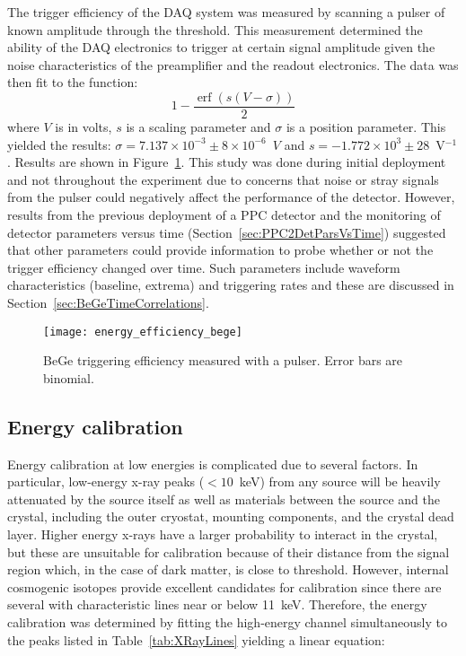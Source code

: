 The trigger efficiency of the DAQ system was measured by scanning a pulser of known amplitude through the threshold.  This measurement determined the ability of the DAQ electronics to trigger at certain signal amplitude given the noise characteristics of the preamplifier and the readout electronics.  The data was then fit to the function:
			\begin{equation}
				1 - \frac{\operatorname{erf} \left(s(V-\sigma)\right)}{2}
				\label{eqn:TrigEfficiency}
			\end{equation}
where $V$ is in volts, $s$ is a scaling parameter and $\sigma$ is a position parameter.  This yielded the results: $\sigma = 7.137\times10^{-3}\pm8\times10^{-6}$~$V$ and $s = -1.772\times10^{3}\pm28$~V$^{-1}$.  Results are shown in Figure~\ref{fig:BeGeTriggeringEfficiency}.  This study was done during initial deployment and not throughout the experiment due to concerns that noise or stray signals from the pulser could negatively affect the performance of the detector.  However, results from the previous deployment of a PPC detector and the monitoring of detector parameters versus time (Section~\ref{sec:PPC2DetParsVsTime}) suggested that other parameters could provide information to probe whether or not the trigger efficiency changed over time.  Such parameters include waveform characteristics (baseline, extrema) and triggering rates and these are discussed in Section~\ref{sec:BeGeTimeCorrelations}.

			\begin{figure}
				\centering
				\texttt{[image: energy\_efficiency\_bege]}
				\caption[BeGe triggering efficiency measured with a pulser]
				{BeGe triggering efficiency measured with a pulser.  Error bars are binomial.}
				\label{fig:BeGeTriggeringEfficiency}
			\end{figure}

		\subsection{Energy calibration}

Energy calibration at low energies is complicated due to several factors.  In particular, low-energy x-ray peaks ($<10$~keV) from any source will be heavily attenuated by the source itself as well as materials between the source and the crystal, including the outer cryostat, mounting components, and the crystal dead layer.  Higher energy x-rays have a larger probability to interact in the crystal, but these are unsuitable for calibration because of their distance from the signal region which, in the case of dark matter, is close to threshold.  However, internal cosmogenic isotopes provide excellent candidates for calibration since there are several with characteristic lines near or below 11~keV.  Therefore, the energy calibration was determined by fitting the high-energy channel simultaneously to the peaks listed in Table~\ref{tab:XRayLines} yielding a linear equation:

